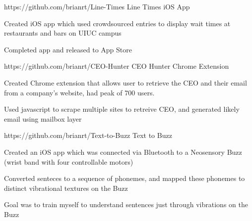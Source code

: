 

\begin{cventries}

  \cventry
    {https://github.com/brianrt/Line-Times} %
    {Line Times iOS App} %
    {} %
    {} %
    {
      \begin{cvitems} %
        \item {Created iOS app which used crowdsourced entries to display wait times at restaurants and bars on UIUC campus}
        \item {Completed app and released to App Store}
      \end{cvitems}
    }

  \cventry
    {https://github.com/brianrt/CEO-Hunter} %
    {CEO Hunter Chrome Extension} %
    {} %
    {} %
    {
      \begin{cvitems} %
        \item {Created Chrome extension that allows user to retrieve the CEO and their email from a company’s website, had peak of 700 users.}
        \item {Used javascript to scrape multiple sites to retreive CEO, and generated likely email using mailbox layer}
      \end{cvitems}
    }

  \cventry
    {https://github.com/brianrt/Text-to-Buzz} %
    {Text to Buzz} %
    {} %
    {} %
    {
      \begin{cvitems} %
        \item {Created an iOS app which was connected via Bluetooth to a Neosensory Buzz (wrist band with four controllable motors)}
        \item {Converted senteces to a sequence of phonemes, and mapped these phonemes to distinct vibrational textures on the Buzz}
        \item {Goal was to train myself to understand sentences just through vibrations on the Buzz}
      \end{cvitems}
    }


\end{cventries}
